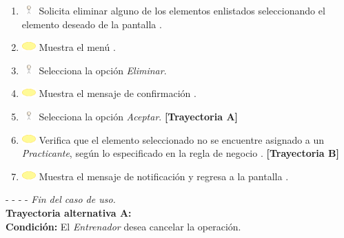 \begin{enumerate}
	\item \includegraphics[width=15pt, height=10pt]{./Figuras/iconosCU/usuario.png} Solicita eliminar alguno de los elementos enlistados seleccionando el elemento deseado de la pantalla .
	\item \includegraphics[width=15pt]{./Figuras/iconosCU/herramienta.png} Muestra el menú .
	\item \includegraphics[width=15pt, height=10pt]{./Figuras/iconosCU/usuario.png} Selecciona la opción \textit{Eliminar}.
	\item \includegraphics[width=15pt]{./Figuras/iconosCU/herramienta.png} Muestra el mensaje de confirmación .
	\item \includegraphics[width=15pt, height=10pt]{./Figuras/iconosCU/usuario.png} Selecciona la opción \textit{Aceptar}. \textbf{[Trayectoria A]} 
	\item \includegraphics[width=15pt]{./Figuras/iconosCU/herramienta.png} Verifica que el elemento seleccionado no se encuentre asignado a un \textit{Practicante}, según lo especificado en la regla de negocio . \textbf{[Trayectoria B]}
	\item \includegraphics[width=15pt]{./Figuras/iconosCU/herramienta.png} Muestra el mensaje de notificación  y regresa a la pantalla .
\end{enumerate}
	
- - - - \textit{Fin del caso de uso.} \\

\textbf{\large{Trayectoria alternativa A:}}\\
\textbf{Condición: } El \textit{Entrenador} desea cancelar la operación.

